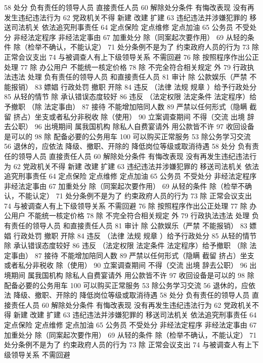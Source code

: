 \documentclass[11pt]{ctexart}
\begin{document}
58 处分
负有责任的领导人员
直接责任人员
60 解除处分条件
有悔改表现
没有再发生违纪违法行为
62 党政机关不得
新建 改建 扩建
63 违纪违法并涉嫌犯罪的
移送司法机关
依法追究刑事责任
64 定点保险 定点维修 定点加油
65 公务员 不受处分
非经法定程序
非经法定事由
67 加重处分
除（同案起次要作用）
69 从轻的条件
除（检举不确认，不能认定）
71 处分条例不是为了
约束政府人员的行为
73 除 正常会议支出
74 与被调查人有上下级领导关系 不需回避
76 除 按照程序作出公正处理
77 除 办公用户
不能统一核定价格
78 除 不完全符合相关规定 外
79 行政执法违法 处理
负有责任的领导人员
和直接责任人员
81 审计
除 公款娱乐（严禁 不能报销）
83 嫖娼 行政处罚
撤职 开除
84 违反 （法律 法规 规章 ）给予行政处分
85 从轻的情节
除 承认错误态度较好
86 违反 （法定权限 法定条件 法定程序）给予撤职
（除 法定事由）
87 接待 不能增加陪同人数
89 严禁以任何形式（隐瞒 截留 挤占）坐支或者私分非税收
除（使用）
90 立案调查期间 不得（交流 出境 辞去公职）
96 出境期间 属我国机构 除私人自费宴请外 用公款皆不许
97 收回设备是可以的
98 除 配备必要的公务用车
100 可以购买正常服务
53 除公务学习交流
56 退休的，应依法
降级、撤职、开除的 降低岗位等级或取消待遇
58 处分
负有责任的领导人员
直接责任人员
60 解除处分条件
有悔改表现
没有再发生违纪违法行为
62 党政机关不得
新建 改建 扩建
63 违纪违法并涉嫌犯罪的
移送司法机关
依法追究刑事责任
64 定点保险 定点维修 定点加油
65 公务员 不受处分
非经法定程序
非经法定事由
67 加重处分
除（同案起次要作用）
69 从轻的条件
除（检举不确认，不能认定）
71 处分条例不是为了
约束政府人员的行为
73 除 正常会议支出
74 与被调查人有上下级领导关系 不需回避
76 除 按照程序作出公正处理
77 除 办公用户
不能统一核定价格
78 除 不完全符合相关规定 外
79 行政执法违法 处理
负有责任的领导人员
和直接责任人员
81 审计
除 公款娱乐（严禁 不能报销）
83 嫖娼 行政处罚
撤职 开除
84 违反 （法律 法规 规章 ）给予行政处分
85 从轻的情节
除 承认错误态度较好
86 违反 （法定权限 法定条件 法定程序）给予撤职
（除 法定事由）
87 接待 不能增加陪同人数
89 严禁以任何形式（隐瞒 截留 挤占）坐支或者私分非税收
除（使用）
90 立案调查期间 不得（交流 出境 辞去公职）
96 出境期间 属我国机构 除私人自费宴请外 用公款皆不许
97 收回设备是可以的
98 除 配备必要的公务用车
100 可以购买正常服务
53 除公务学习交流
56 退休的，应依法
降级、撤职、开除的 降低岗位等级或取消待遇
58 处分
负有责任的领导人员
直接责任人员
60 解除处分条件
有悔改表现
没有再发生违纪违法行为
62 党政机关不得
新建 改建 扩建
63 违纪违法并涉嫌犯罪的
移送司法机关
依法追究刑事责任
64 定点保险 定点维修 定点加油
65 公务员 不受处分
非经法定程序
非经法定事由
67 加重处分
除（同案起次要作用）
69 从轻的条件
除（检举不确认，不能认定）
71 处分条例不是为了
约束政府人员的行为
73 除 正常会议支出
74 与被调查人有上下级领导关系 不需回避
\end{document}
